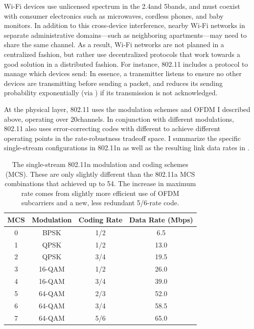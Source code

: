 Wi-Fi devices use unlicensed spectrum in the 2.4\GHz and 5\GHz bands, and must coexist with consumer electronics such as microwaves, cordless phones, and baby monitors. In addition to this cross-device interference, nearby Wi-Fi networks in separate administrative domains---such as neighboring apartments---may need to share the same channel. As a result, Wi-Fi networks are not planned in a centralized fashion, but rather use decentralized protocols that work towards a good solution in a distributed fashion. For instance, 802.11 includes a  protocol to manage which devices send: In essence, a transmitter listens to ensure no other devices are transmitting before sending a packet, and reduces its sending probability exponentially (via ) if its transmission is not acknowledged.

At the physical layer, 802.11 uses the modulation schemes and OFDM I described above, operating over 20\MHz channels. In conjunction with different modulations, 802.11 also uses error-correcting codes with different  to achieve different operating points in the rate-robustness tradeoff space. I summarize the specific single-stream configurations in 802.11n as well as the resulting link data rates in .

\begin{table}[t]
\centering
\begin{tabular}{cccc}
\toprule
MCS & Modulation & Coding Rate & Data Rate (Mbps) \\
\midrule
0 & BPSK & 1/2 & 6.5 \\
1 & QPSK & 1/2 & 13.0\\
2 & QPSK & 3/4 & 19.5\\
3 & 16-QAM & 1/2 & 26.0\\
4 & 16-QAM & 3/4 & 39.0\\
5 & 64-QAM & 2/3 & 52.0\\
6 & 64-QAM & 3/4 & 58.5\\
7 & 64-QAM & 5/6 & 65.0\\
\bottomrule
\end{tabular}
\caption[The 802.11n single-stream rates]{\label{tab:siso_mcs} The single-stream 802.11n modulation and coding schemes (MCS). These are only slightly different than the 802.11a MCS combinations that achieved up to 54\Mbps. The increase in maximum rate comes from slightly more efficient use of OFDM subcarriers and a new, less redundant 5/6-rate code.}
\end{table}

